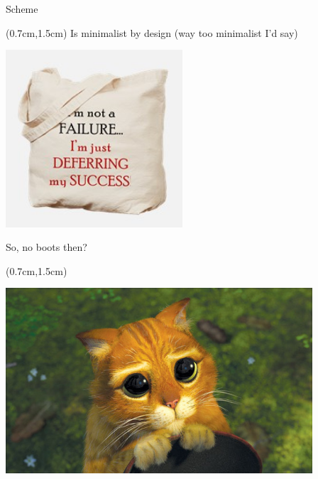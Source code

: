 \documentclass[xetex,14pt,aspectratio=169]{beamer}
\begin{document}
\begin{frame}{Scheme}
\begin{textblock*}{\framewidth-0.8cm}(0.7cm,1.5cm) %
Is minimalist by design (way too minimalist I'd say)
\begin{minipage}{\textwidth}
  \centering
  \includegraphics[height=6.6cm]{img/defer}
\end{minipage}
\end{textblock*}
\end{frame}

\begin{frame}{So, no boots then?}
\begin{textblock*}{\framewidth-0.8cm}(0.7cm,1.5cm) %
\begin{minipage}{\textwidth}
  \centering
  \includegraphics[height=6.9cm]{img/puss}
\end{minipage}
\end{textblock*}
\end{frame}
\end{document}
